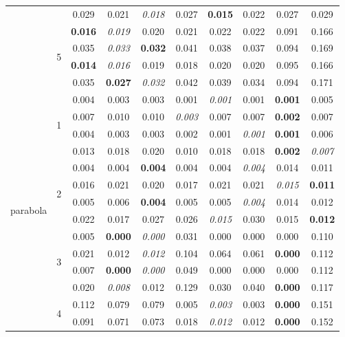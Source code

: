 \documentclass[authoryear, review, 11pt]{elsarticle}
\begin{document}
\begin{table}[ht]
\begin{center}
{\begin{tabular}{cccccccccc}
  &  & 0.029 & 0.021 & \emph{0.018} & 0.027 & \textbf{0.015} & 0.022 & 0.027 & 0.029 \\ 
  \cline{3-10}
  & \multirow{4}{*}{5} & \textbf{0.016} & \emph{0.019} & 0.020 & 0.021 & 0.022 & 0.022 & 0.091 & 0.166 \\ 
  &  & 0.035 & \emph{0.033} & \textbf{0.032} & 0.041 & 0.038 & 0.037 & 0.094 & 0.169 \\ 
  &  & \textbf{0.014} & \emph{0.016} & 0.019 & 0.018 & 0.020 & 0.020 & 0.095 & 0.166 \\ 
  &  & 0.035 & \textbf{0.027} & \emph{0.032} & 0.042 & 0.039 & 0.034 & 0.094 & 0.171 \\ 
  \hline
  \multirow{20}{*}{parabola} & \multirow{4}{*}{1} & 0.004 & 0.003 & 0.003 & 0.001 & \emph{0.001} & 0.001 & \textbf{0.001} & 0.005 \\ 
  &  & 0.007 & 0.010 & 0.010 & \emph{0.003} & 0.007 & 0.007 & \textbf{0.002} & 0.007 \\ 
  &  & 0.004 & 0.003 & 0.003 & 0.002 & 0.001 & \emph{0.001} & \textbf{0.001} & 0.006 \\ 
  &  & 0.013 & 0.018 & 0.020 & 0.010 & 0.018 & 0.018 & \textbf{0.002} & \emph{0.007} \\ 
  \cline{3-10}
  & \multirow{4}{*}{2} & 0.004 & 0.004 & \textbf{0.004} & 0.004 & 0.004 & \emph{0.004} & 0.014 & 0.011 \\ 
  &  & 0.016 & 0.021 & 0.020 & 0.017 & 0.021 & 0.021 & \emph{0.015} & \textbf{0.011} \\ 
  &  & 0.005 & 0.006 & \textbf{0.004} & 0.005 & 0.005 & \emph{0.004} & 0.014 & 0.012 \\ 
  &  & 0.022 & 0.017 & 0.027 & 0.026 & \emph{0.015} & 0.030 & 0.015 & \textbf{0.012} \\ 
  \cline{3-10}
  & \multirow{4}{*}{3} & 0.005 & \textbf{0.000} & \emph{0.000} & 0.031 & 0.000 & 0.000 & 0.000 & 0.110 \\ 
  &  & 0.021 & 0.012 & \emph{0.012} & 0.104 & 0.064 & 0.061 & \textbf{0.000} & 0.112 \\ 
  &  & 0.007 & \textbf{0.000} & \emph{0.000} & 0.049 & 0.000 & 0.000 & 0.000 & 0.112 \\ 
  &  & 0.020 & \emph{0.008} & 0.012 & 0.129 & 0.030 & 0.040 & \textbf{0.000} & 0.117 \\ 
  \cline{3-10}
  & \multirow{4}{*}{4} & 0.112 & 0.079 & 0.079 & 0.005 & \emph{0.003} & 0.003 & \textbf{0.000} & 0.151 \\ 
  &  & 0.091 & 0.071 & 0.073 & 0.018 & \emph{0.012} & 0.012 & \textbf{0.000} & 0.152 \\ 

\end{tabular}}
\end{center}
\end{table}
\end{document}
